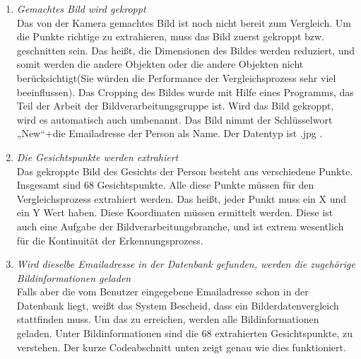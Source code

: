 \begin{enumerate}
Gleich nachdem der Benutzer sein Email eingegeben hat, macht die Kamera das Bild. Dieses Bild wird tempor{\"a}r gespeichert, weil es nach dem Vergleich mit dem Bild, das schon in der Datenbank liegt, nicht mehr benötigt wird. Sonst w{\"u}rde es extrem viele Bilderdaten in der Datenbank geben, die nur einmal verwendet werden. Stattdessen wird nur der Pfad des Bildes zusammen mit den extrahierten Punkten in der Datenbank gespeichert.
	\item \textit{Gemachtes Bild wird gekroppt} \\
	
Das von der Kamera gemachtes Bild ist noch nicht bereit zum Vergleich. Um die Punkte richtige zu extrahieren, muss das Bild zuerst gekroppt bzw. geschnitten sein. Das heißt, die Dimensionen des Bildes werden reduziert, und somit werden die andere Objekten oder die andere Objekten nicht berücksichtigt(Sie würden die Performance der Vergleichsprozess sehr viel beeinflussen). Das Cropping des Bildes wurde mit Hilfe eines Programms, das Teil der Arbeit der Bildverarbeitungsgruppe ist. Wird das Bild gekroppt, wird es automatisch auch umbenannt. Das Bild nimmt der Schlüsselwort „New“+die Emailadresse der Person als Name. Der Datentyp ist .jpg .
	\item \textit{Die Gesichtspunkte werden extrahiert} \\
	
Das gekroppte Bild des Gesichts der Person besteht aus verschiedene Punkte. Insgesamt sind 68 Gesichtspunkte. Alle diese Punkte müssen für den Vergleichsprozess extrahiert werden. Das heißt, jeder Punkt muss ein X und ein Y Wert haben. Diese Koordinaten müssen ermittelt werden. Diese ist auch eine Aufgabe der Bildverarbeitungsbranche, und ist extrem wesentlich für die Kontinuität der Erkennungsprozess.
	\item \textit{Wird dieselbe Emailadresse in der Datenbank gefunden, werden die zugehörige Bildinformationen geladen} \\
	
	Falls aber die vom Benutzer eingegebene Emailadresse schon in der Datenbank liegt, weißt das System Bescheid, dass ein Bilderdatenvergleich stattfinden muss. Um das zu erreichen, werden alle Bildinformationen geladen. Unter Bildinformationen sind die 68 extrahierten Gesichtspunkte, zu verstehen. Der kurze Codeabschnitt unten zeigt genau wie dies funktioniert. \\
	

\end{enumerate}
